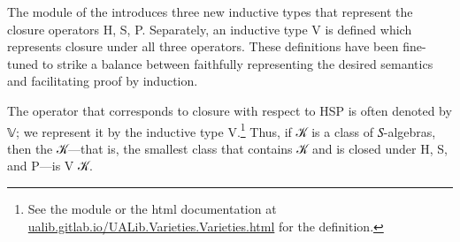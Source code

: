 \documentclass[a4paper,UKenglish,cleveref,autoref,thm-restate]{lipics-v2021}
\begin{document}
The \ualibVarietiesVarieties module of the \agdaualib introduces three new inductive types that represent the closure operators \af H, \af S, \af P. Separately, an inductive type \af V is defined which represents closure under all three operators. These definitions have been fine-tuned to strike a balance between faithfully representing the desired semantics and facilitating proof by induction.
\ccpad
\begin{code}%
  
\end{code}
\ccpad
\begin{code}%
  
\end{code}
\ccpad
\begin{code}%
  
\end{code}
\ccpad
The operator that corresponds to closure with respect to \ad H\ad S\ad P is often denoted by 𝕍; we represent it by the inductive type \ad V.\footnote{See the \ualibVarietiesVarieties module or the html documentation at\\ \href{https://ualib.gitlab.io/UALib.Varieties.Varieties.html}{ualib.gitlab.io/UALib.Varieties.Varieties.html} for the definition.}
Thus, if \ab 𝒦 is a class of \ab 𝑆-algebras, then the  \ab 𝒦---that is, the smallest class that contains \ab 𝒦 and is closed under \ad H, \ad S, and \ad P---is \ad V \ab 𝒦.
\end{document}
